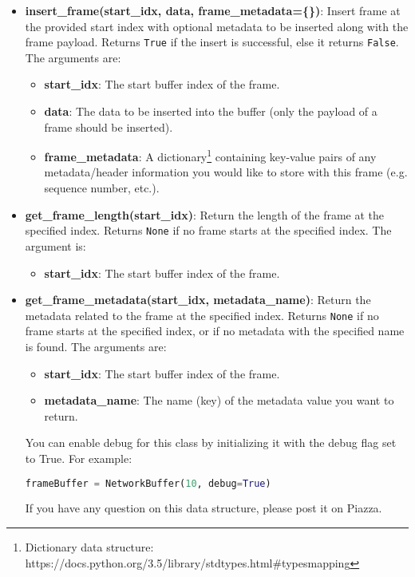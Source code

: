 \documentclass[11pt]{article}
\begin{document}
\begin{itemize}
    \item \textbf{insert\_frame(start\_idx, data, frame\_metadata=\{\})}: Insert frame at the provided start index with optional metadata to be inserted along with the frame payload. Returns \texttt{True} if the insert is successful, else it returns \texttt{False}. The arguments are:
    \begin{itemize}
        \item \textbf{start\_idx}: The start buffer index of the frame.
        \item \textbf{data}: The data to be inserted into the buffer (only the payload of a frame should be inserted).
        \item \textbf{frame\_metadata}: A dictionary\footnote{Dictionary data structure: https://docs.python.org/3.5/library/stdtypes.html\#typesmapping} containing key-value pairs of any metadata/header information you would like to store with this frame (e.g. sequence number, etc.).
    \end{itemize}

    \item \textbf{get\_frame\_length(start\_idx)}: Return the length of the frame at the specified index. Returns \texttt{None} if no frame starts at the specified index. The argument is:
    \begin{itemize}
        \item \textbf{start\_idx}: The start buffer index of the frame.
    \end{itemize}

    \item \textbf{get\_frame\_metadata(start\_idx, metadata\_name)}: Return the metadata related to the frame at the specified index. Returns \texttt{None} if no frame starts at the specified index, or if no metadata with the specified name is found. The arguments are:
    \begin{itemize}
        \item \textbf{start\_idx}: The start buffer index of the frame.
        \item \textbf{metadata\_name}: The name (key) of the metadata value you want to return.
    \end{itemize}

You can enable debug for this class by initializing it with the debug flag set to True. For example:

\begin{lstlisting}[caption={}, language=Python]
frameBuffer = NetworkBuffer(10, debug=True)
\end{lstlisting}

If you have any question on this data structure, please post it on Piazza.

\end{itemize}
\end{document}
